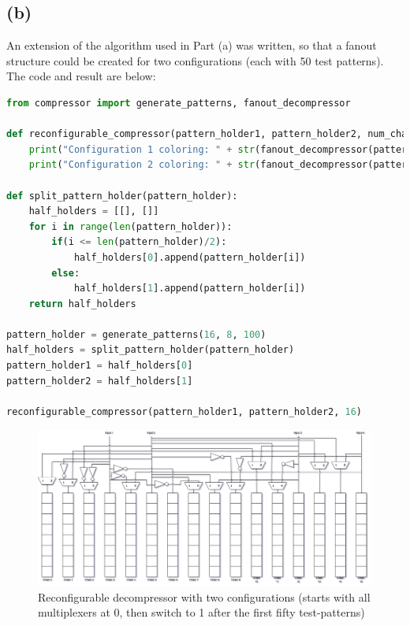\documentclass[letterpaper]{article} %
\begin{document}
\subsection*{(b)}
\hspace{0.5cm}An extension of the algorithm used in Part (a) was written, so that a fanout structure could be created for two configurations (each with 50 test patterns). The code and result are below:
\begin{lstlisting}[language=Python, caption=Python code used to generate test-patterns; produce the conflict graph; and color the graph in two configurations]
	from compressor import generate_patterns, fanout_decompressor

def reconfigurable_compressor(pattern_holder1, pattern_holder2, num_chains):
    print("Configuration 1 coloring: " + str(fanout_decompressor(pattern_holder1, num_chains)))
    print("Configuration 2 coloring: " + str(fanout_decompressor(pattern_holder2, num_chains)))

def split_pattern_holder(pattern_holder):
    half_holders = [[], []]
    for i in range(len(pattern_holder)):
        if(i <= len(pattern_holder)/2):
            half_holders[0].append(pattern_holder[i])
        else:
            half_holders[1].append(pattern_holder[i])
    return half_holders

pattern_holder = generate_patterns(16, 8, 100)
half_holders = split_pattern_holder(pattern_holder)
pattern_holder1 = half_holders[0]
pattern_holder2 = half_holders[1]

reconfigurable_compressor(pattern_holder1, pattern_holder2, 16)
\end{lstlisting}

\newpage

\begin{figure}[ht]
	\centering
	\includegraphics[width=16.0cm]{reconfig.png}
	\caption{Reconfigurable decompressor with two configurations (starts with all multiplexers at 0, then switch to 1 after the first fifty test-patterns)}
\end{figure}
\end{document}

